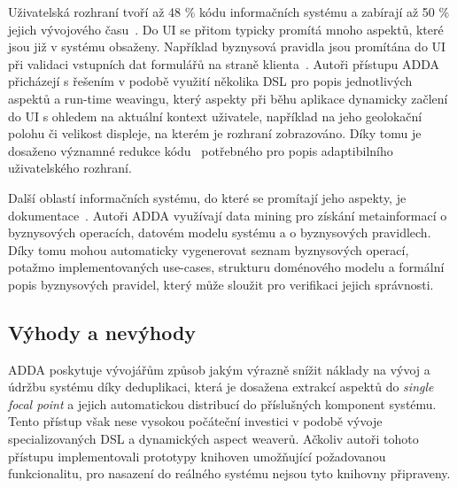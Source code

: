 
Uživatelská rozhraní tvoří až 48 \% kódu informačních systému
a zabírají až 50 \% jejich vývojového času~\cite{kennard2009separation}.
Do \gls{UI} se přitom typicky promítá mnoho aspektů, které jsou
již v systému obsaženy. Například byznysová pravidla jsou promítána do \gls{UI}
při validaci vstupních dat formulářů na straně klienta~\cite{cemus2017separation}.
Autoři přístupu \gls{ADDA} přicházejí s řešením v podobě
využití několika \gls{DSL} pro popis jednotlivých aspektů
a run-time weavingu, který aspekty při běhu aplikace
dynamicky začlení do \gls{UI} s ohledem na aktuální kontext
uživatele, například na jeho geolokační polohu či velikost
displeje, na kterém je rozhraní zobrazováno.
Díky tomu je dosaženo významné redukce kódu~\cite{cemus2016context}
potřebného pro popis adaptibilního uživatelského rozhraní.


Další oblastí informačních systému, do které se promítají jeho aspekty,
je dokumentace~\cite{cemus2017automated}. Autoři \gls{ADDA}
využívají data mining pro získání metainformací o byznysových operacích,
datovém modelu systému a o byznysových pravidlech. Díky tomu mohou
automaticky vygenerovat seznam byznysových operací, potažmo implementovaných
use-cases, strukturu doménového modelu a formální popis byznysových pravidel,
který může sloužit pro verifikaci jejich správnosti.

\subsection{Výhody a nevýhody}

\gls{ADDA} poskytuje vývojářům způsob jakým výrazně snížit náklady na vývoj a údržbu
systému díky deduplikaci, která je dosažena extrakcí aspektů
do \textit{single focal point} a jejich automatickou distribucí do
příslušných komponent systému. Tento přístup však nese vysokou počáteční investici v
podobě vývoje specializovaných \gls{DSL} a dynamických aspect weaverů.
Ačkoliv autoři tohoto přístupu implementovali prototypy knihoven umožňující
požadovanou funkcionalitu, pro nasazení do reálného systému
nejsou tyto knihovny připraveny.

